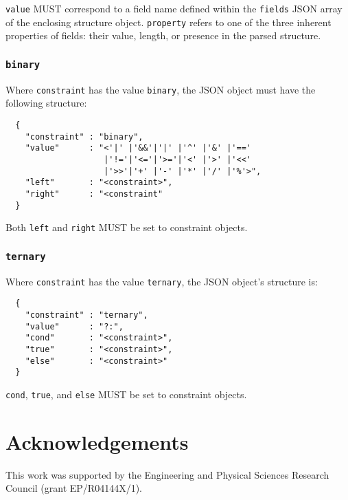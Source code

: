 \documentclass[10pt,twocolumn,a4paper]{article}
\begin{document}
\texttt{value} MUST correspond to a field name defined within the \texttt{fields} JSON
array of the enclosing structure object. \texttt{property} refers to one of the three
inherent properties of fields: their value, length, or presence in the parsed structure.

\subsubsection{\texttt{binary}}

Where \texttt{constraint} has the value \texttt{binary}, the JSON object must have
the following structure:

\begin{verbatim}
  {
    "constraint" : "binary",
    "value"      : "<'|' |'&&'|'|' |'^' |'&' |'=='
                    |'!='|'<='|'>='|'<' |'>' |'<<'
                    |'>>'|'+' |'-' |'*' |'/' |'%'>",
    "left"       : "<constraint>",
    "right"	     : "<constraint"
  }
\end{verbatim}

Both \texttt{left} and \texttt{right} MUST be set to constraint objects.

\subsubsection{\texttt{ternary}}

Where \texttt{constraint} has the value \texttt{ternary}, the JSON object's structure is:

\begin{verbatim}
  {
    "constraint" : "ternary",
    "value"      : "?:",
    "cond"       : "<constraint>",
    "true"       : "<constraint>",
    "else"       : "<constraint>"
  }
\end{verbatim}

\texttt{cond}, \texttt{true}, and \texttt{else} MUST be set to constraint objects.

\section{Acknowledgements}

This work was supported by the Engineering and Physical Sciences Research
Council (grant EP/R04144X/1).
\end{document}
